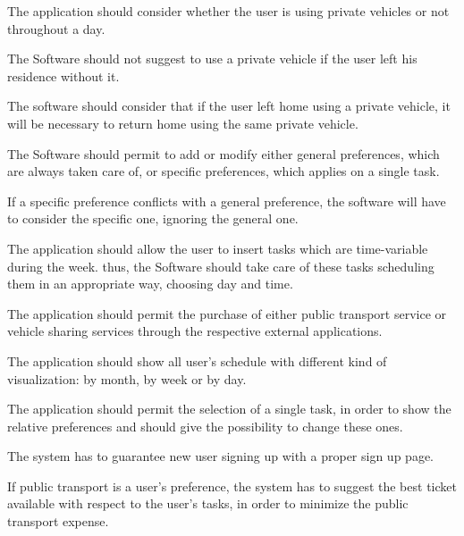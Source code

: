 \begin{requirementList}
    \item The application should consider whether the user is using private vehicles or not throughout a day.
    \begin{enumerate}[label={[}R 11.\arabic*{]}:]
    \item The Software should not suggest to use a private vehicle if the user left his residence without it.
   
    \item The software should consider that if the user left home using a private vehicle, it will be necessary to return home using the same private vehicle.
    \end{enumerate}
    
    \item The Software should permit to add or modify either general preferences, which are always taken care of, or specific preferences, which applies on a single task.
    \begin{enumerate}[label={[}R 13.\arabic*{]}:]
    \item If a specific preference conflicts with a general preference, the software will have to consider the specific one, ignoring the general one.
    \end{enumerate}
    
    \item The application should allow the user to insert tasks which are time-variable during the week. thus, the Software should take care of these tasks scheduling them in an appropriate way, choosing day and time.
    
    \item The application should permit the purchase of either public transport service or vehicle sharing services through the respective external applications.
    
    \item The application should show all user's schedule with different kind of visualization: by month, by week or by day.
    
    \item The application should permit the selection of a single task, in order to show the relative preferences and should give the possibility to change these ones.
    
    \item The system has to guarantee new user signing up with a proper sign up page. 
    \item If public transport is a user's preference, the system has to suggest the best ticket available with respect to the user's tasks, in order to minimize the public transport expense.
\end{requirementList}

